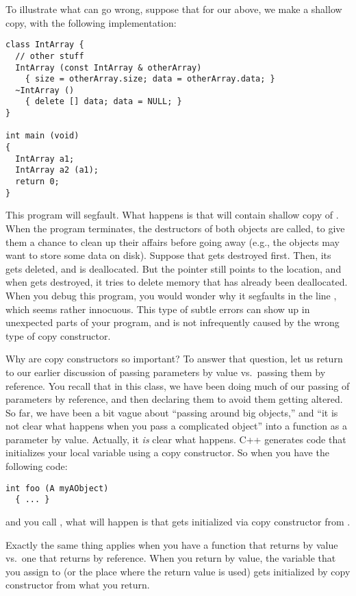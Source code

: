 To illustrate what can go wrong, suppose that for our  above,
we make a shallow copy, with the following implementation:
\begin{verbatim}
class IntArray {
  // other stuff
  IntArray (const IntArray & otherArray)
    { size = otherArray.size; data = otherArray.data; }
  ~IntArray ()
    { delete [] data; data = NULL; }
}

int main (void)
{
  IntArray a1;
  IntArray a2 (a1);
  return 0;
}
\end{verbatim}

This program will segfault.
What happens is that  will contain shallow copy of .
When the program terminates, the destructors of both objects are
called, to give them a chance to clean up their affairs before going
away (e.g., the objects may want to store some data on disk).
Suppose that  gets destroyed first.
Then, its  gets deleted, and is deallocated. 
But the pointer  still points to the location,
and when  gets destroyed,
it tries to delete memory that has already been deallocated.
When you debug this program, you would wonder why it segfaults in the
line , which seems rather innocuous.
This type of subtle errors can show up in unexpected parts of your
program, and is not infrequently caused by the wrong type of copy
constructor.  

Why are copy constructors so important?
To answer that question, let us return to our earlier discussion of
passing parameters by value vs.~passing them by reference.
You recall that in this class, we have been doing much of our passing
of parameters by reference,
and then declaring them  to avoid them getting altered.
So far, we have been a bit vague about ``passing around big objects,''
and ``it is not clear what happens when you pass a complicated object''
into a function as a parameter by value.
Actually, it \emph{is} clear what happens.
C++ generates code that initializes your local variable using a copy
constructor. So when you have the following code:
\begin{verbatim}
int foo (A myAObject)
  { ... }
\end{verbatim}
and you call , what will happen is that 
gets initialized via copy constructor from .

Exactly the same thing applies when you have a function that returns
by value vs.~one that returns by reference.
When you return by value, the variable that you assign to
(or the place where the return value is used) gets initialized by copy 
constructor from what you return.


